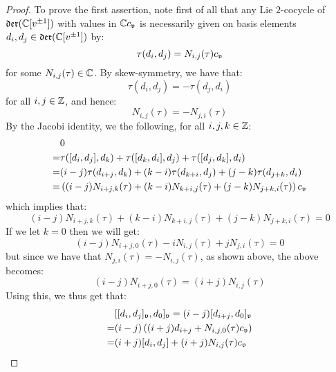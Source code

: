 \begin{proof}
                To prove the first assertion, note first of all that any Lie $2$-cocycle of $\mathfrak{der}(\mathbb{C}[v^{\pm 1}])$ with values in $\mathbb{C} c_{\mathfrak{v}}$ is necessarily given on basis elements $d_i, d_j \in \mathfrak{der}(\mathbb{C}[v^{\pm 1}])$ by:
                    $$\tau(d_i, d_j) = N_{i, j}(\tau) c_{\mathfrak{v}}$$
                for some $N_{i, j}(\tau) \in \mathbb{C}$. By skew-symmetry, we have that:
                    $$\tau(d_i, d_j) = -\tau(d_j, d_i)$$
                for all $i, j \in \mathbb{Z}$, and hence:
                    $$N_{i, j}(\tau) = -N_{j, i}(\tau)$$
                By the Jacobi identity, we the following, for all $i, j, k \in \mathbb{Z}$:
                    $$
                        \begin{aligned}
                            & 0
                            \\
                            = & \tau([d_i, d_j], d_k) + \tau([d_k, d_i], d_j) + \tau([d_j, d_k], d_i)
                            \\
                            = & (i - j) \tau(d_{i + j}, d_k) + (k - i) \tau(d_{k + i}, d_j) + (j - k) \tau(d_{j + k}, d_i)
                            \\
                            = & \left( (i - j) N_{i + j, k}(\tau) + (k - i) N_{k + i, j}(\tau) + (j - k) N_{j + k, i}(\tau) \right) c_{\mathfrak{v}}
                        \end{aligned}
                    $$
                which implies that:
                    $$(i - j) N_{i + j, k}(\tau) + (k - i) N_{k + i, j}(\tau) + (j - k) N_{j + k, i}(\tau) = 0$$
                If we let $k = 0$ then we will get:
                    $$(i - j) N_{i + j, 0}(\tau) - i N_{i, j}(\tau) + j N_{j, i}(\tau) = 0$$
                but since we have that $N_{j, i}(\tau) = -N_{i, j}(\tau)$, as shown above, the above becomes:
                    $$(i - j) N_{i + j, 0}(\tau) = (i + j) N_{i, j}(\tau)$$
                Using this, we thus get that:
                    $$
                        \begin{aligned}
                            & [[d_i, d_j]_{\mathfrak{v}}, d_0]_{\mathfrak{v}} = (i - j) [d_{i + j}, d_0]_{\mathfrak{v}}
                            \\
                            = & (i - j) \left( (i + j) d_{i + j} + N_{i, j, 0}(\tau) c_{\mathfrak{v}} \right)
                            \\
                            = & (i + j) [d_i, d_j] + (i + j) N_{i, j}(\tau) c_{\mathfrak{v}}
                        \end{aligned}
                    $$

\end{proof}
